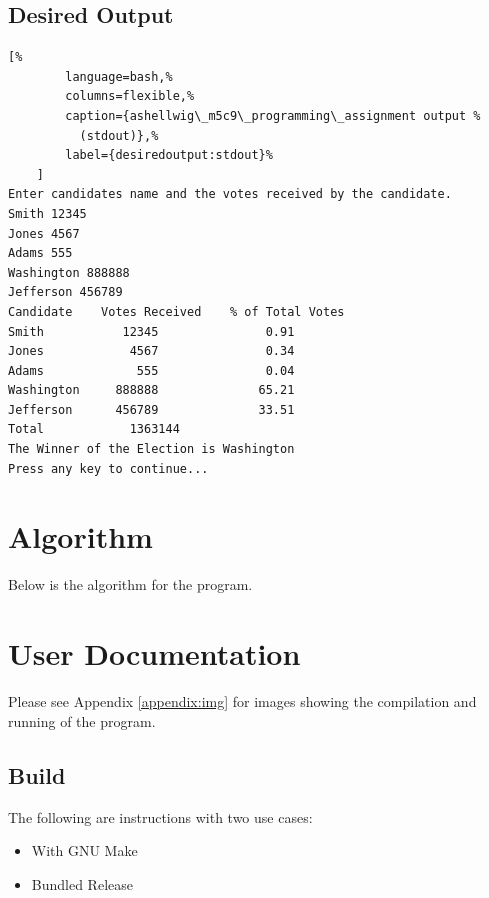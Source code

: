 \documentclass[a4paper, 11pt]{article}
\theoremstyle{definition}
\theoremstyle{plain}
\begin{document}
    \subsection{Desired Output}
      \begin{lstlisting}[%
        language=bash,%
        columns=flexible,%
        caption={ashellwig\_m5c9\_programming\_assignment output %
          (stdout)},%
        label={desiredoutput:stdout}%
    ]
Enter candidates name and the votes received by the candidate.
Smith 12345
Jones 4567
Adams 555
Washington 888888
Jefferson 456789
Candidate    Votes Received    % of Total Votes
Smith           12345               0.91
Jones            4567               0.34
Adams             555               0.04
Washington     888888              65.21
Jefferson      456789              33.51
Total            1363144
The Winner of the Election is Washington
Press any key to continue...
  \end{lstlisting}


  \newpage
  \section{Algorithm}
    Below is the algorithm for the program.

     


  \newpage
  \section{User Documentation}
    Please see Appendix \ref{appendix:img} for images showing the compilation
      and running of the program.

    \subsection{Build}
      The following are instructions with two use cases:
      \begin{itemize}
        \item With GNU Make
        \item Bundled Release
      \end{itemize}
\end{document}
